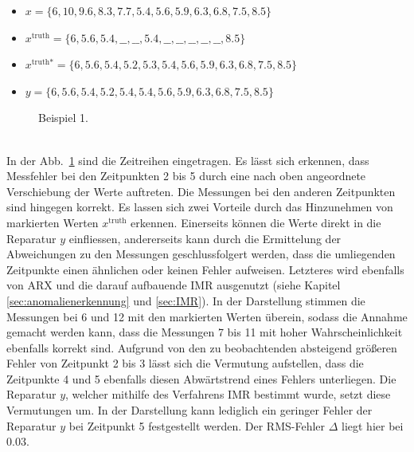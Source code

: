 \begin{itemize}
    \item $x =                 \{6, 10, 9.6, 8.3, 7.7, 5.4, 5.6, 5.9, 6.3, 6.8, 7.5, 8.5\}$
    \item $x^{\text{truth}} =  \{6, 5.6, 5.4,  \_\_, \_\_,5.4, \_\_,\_\_,\_\_,\_\_,\_\_,8.5\}$
    \item $x^{\text{truth*}} =  \{6, 5.6, 5.4,  5.2, 5.3, 5.4, 5.6, 5.9, 6.3, 6.8, 7.5, 8.5\}$
    \item $y =  \{6, 5.6, 5.4,  5.2, 5.4, 5.4, 5.6, 5.9, 6.3, 6.8, 7.5, 8.5\}$
\end{itemize}
\begin{figure}
    \caption{Beispiel 1.}\label{fig:1}
\end{figure}
~\\
In der Abb.\ \ref{fig:1} sind die Zeitreihen eingetragen. Es lässt sich
erkennen, dass Messfehler bei den Zeitpunkten 2 bis 5 durch eine nach oben
angeordnete Verschiebung der Werte auftreten. Die Messungen bei den anderen
Zeitpunkten sind hingegen korrekt.  Es lassen sich zwei Vorteile durch das
Hinzunehmen von markierten Werten $x^{\text{truth}}$ erkennen.  Einerseits
können die Werte direkt in die Reparatur $y$ einfliessen, andererseits kann
durch die Ermittelung der Abweichungen zu den Messungen geschlussfolgert
werden, dass die umliegenden Zeitpunkte einen ähnlichen oder keinen Fehler
aufweisen.  Letzteres wird ebenfalls von ARX und die darauf aufbauende IMR
ausgenutzt (siehe Kapitel \ref{sec:anomalienerkennung} und \ref{sec:IMR}). In
der Darstellung stimmen die Messungen bei 6 und 12 mit den markierten Werten
überein, sodass die Annahme gemacht werden kann, dass die Messungen 7 bis 11
mit hoher Wahrscheinlichkeit ebenfalls korrekt sind.  Aufgrund von den zu
beobachtenden absteigend größeren Fehler von Zeitpunkt 2 bis 3 lässt sich die
Vermutung aufstellen, dass die Zeitpunkte 4 und 5 ebenfalls diesen Abwärtstrend
eines Fehlers unterliegen. Die Reparatur $y$, welcher mithilfe des Verfahrens IMR
bestimmt wurde, setzt diese Vermutungen um.  In der Darstellung kann lediglich
ein geringer Fehler der Reparatur $y$ bei Zeitpunkt 5 festgestellt werden. Der
RMS-Fehler $\Delta$ liegt hier bei $0.03$.   

